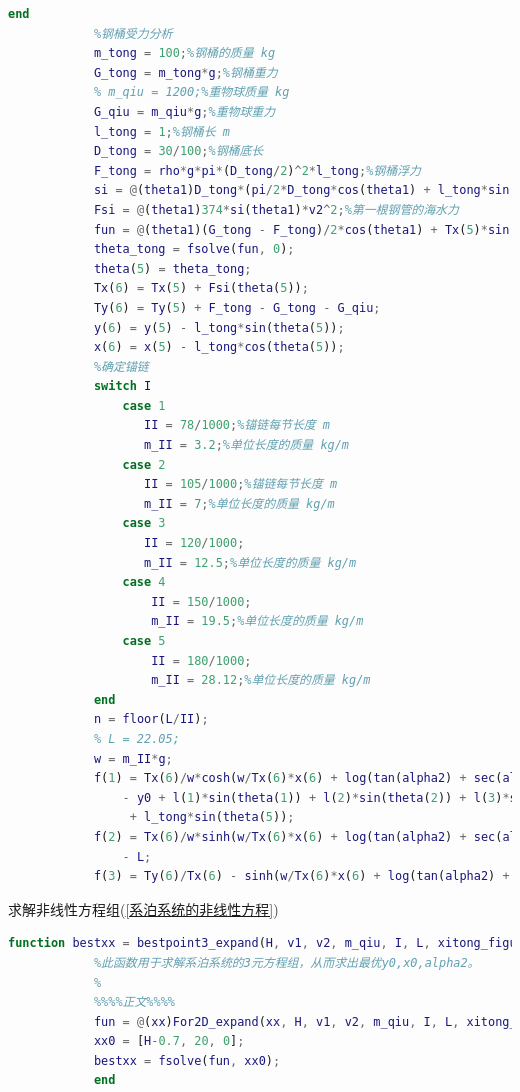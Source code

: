 \begin{lstlisting}[language = Matlab]
            end
            %钢桶受力分析
            m_tong = 100;%钢桶的质量 kg
            G_tong = m_tong*g;%钢桶重力
            % m_qiu = 1200;%重物球质量 kg
            G_qiu = m_qiu*g;%重物球重力
            l_tong = 1;%钢桶长 m
            D_tong = 30/100;%钢桶底长
            F_tong = rho*g*pi*(D_tong/2)^2*l_tong;%钢桶浮力
            si = @(theta1)D_tong*(pi/2*D_tong*cos(theta1) + l_tong*sin(theta1));%第一根钢管的海水法平面投影
            Fsi = @(theta1)374*si(theta1)*v2^2;%第一根钢管的海水力
            fun = @(theta1)(G_tong - F_tong)/2*cos(theta1) + Tx(5)*sin(theta1) + Fsi(theta1)*sin(theta1)/2 - Ty(5)*cos(theta1);
            theta_tong = fsolve(fun, 0);
            theta(5) = theta_tong;
            Tx(6) = Tx(5) + Fsi(theta(5));
            Ty(6) = Ty(5) + F_tong - G_tong - G_qiu;
            y(6) = y(5) - l_tong*sin(theta(5));
            x(6) = x(5) - l_tong*cos(theta(5));
            %确定锚链
            switch I
                case 1
                   II = 78/1000;%锚链每节长度 m
                   m_II = 3.2;%单位长度的质量 kg/m
                case 2
                   II = 105/1000;%锚链每节长度 m
                   m_II = 7;%单位长度的质量 kg/m
                case 3
                   II = 120/1000;
                   m_II = 12.5;%单位长度的质量 kg/m
                case 4
                    II = 150/1000;
                    m_II = 19.5;%单位长度的质量 kg/m
                case 5
                    II = 180/1000;
                    m_II = 28.12;%单位长度的质量 kg/m
            end
            n = floor(L/II);
            % L = 22.05;
            w = m_II*g;
            f(1) = Tx(6)/w*cosh(w/Tx(6)*x(6) + log(tan(alpha2) + sec(alpha2))) - Tx(6)/w*sec(alpha2)...
                - y0 + l(1)*sin(theta(1)) + l(2)*sin(theta(2)) + l(3)*sin(theta(3)) + l(4)*sin(theta(4))...
                 + l_tong*sin(theta(5));
            f(2) = Tx(6)/w*sinh(w/Tx(6)*x(6) + log(tan(alpha2) + sec(alpha2))) - Tx(6)/w*tan(alpha2)...
                - L;
            f(3) = Ty(6)/Tx(6) - sinh(w/Tx(6)*x(6) + log(tan(alpha2) + sec(alpha2)));
            \end{lstlisting}
            求解非线性方程组(\ref{系泊系统的非线性方程})
            \begin{lstlisting}[language = Matlab]
            function bestxx = bestpoint3_expand(H, v1, v2, m_qiu, I, L, xitong_figure, xitong_save)
            %此函数用于求解系泊系统的3元方程组，从而求出最优y0,x0,alpha2。
            %
            %%%%正文%%%%
            fun = @(xx)For2D_expand(xx, H, v1, v2, m_qiu, I, L, xitong_figure, xitong_save);
            xx0 = [H-0.7, 20, 0];
            bestxx = fsolve(fun, xx0);
            end
            \end{lstlisting}
